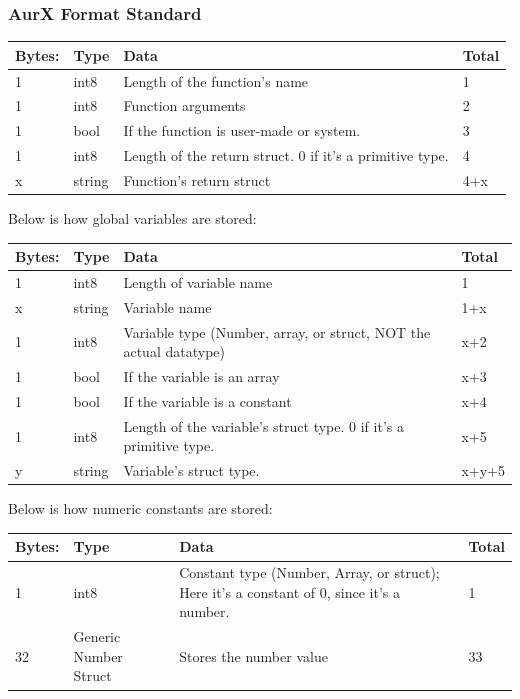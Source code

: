 \documentclass[12pt, letterpaper, oneside]{article}
\begin{document}
	\subsubsection{AurX Format Standard}
	\begin{tabular}{|p{1cm}|p{2cm}|p{10cm}|p{2cm}|}
		\hline
		Bytes:&Type&Data&Total\\
		\hline
		1&int8&Length of the function's name&1\\
		\hline
		1&int8&Function arguments&2\\
		\hline
		1&bool&If the function is user-made or system.&3\\
		\hline
		1&int8&Length of the return struct. 0 if it's a primitive type.&4\\
		\hline
		x&string&Function's return struct&4+x\\
		\hline
	\end{tabular}
	\newline
	Below is how global variables are stored:
	\newline
	\begin{tabular}{|p{1cm}|p{2cm}|p{10cm}|p{2cm}|}
		\hline
		Bytes:&Type&Data&Total\\
		\hline
		1&int8&Length of variable name&1\\
		\hline
		x&string&Variable name&1+x\\
		\hline
		1&int8&Variable type (Number, array, or struct, NOT the actual datatype)&x+2\\
		\hline
		1&bool&If the variable is an array&x+3\\
		\hline
		1&bool&If the variable is a constant&x+4\\
		\hline
		1&int8&Length of the variable's struct type. 0 if it's a primitive type.&x+5\\
		\hline
		y&string&Variable's struct type.&x+y+5\\
		\hline
	\end{tabular}
	\newline
	Below is how numeric constants are stored:
	\newline
	\begin{tabular}{|p{1cm}|p{2cm}|p{10cm}|p{2cm}|}
		\hline
		Bytes:&Type&Data&Total\\
		\hline
		1&int8&Constant type (Number, Array, or struct); Here it's a constant of 0, since it's a number.&1\\
		\hline
		32&Generic Number Struct&Stores the number value&33\\
		\hline
	\end{tabular} 
\end{document}
